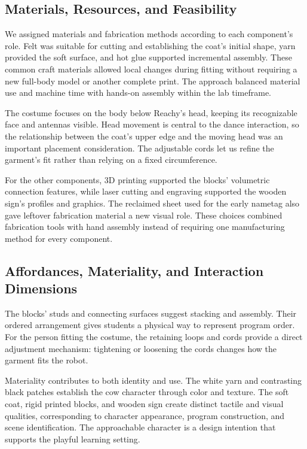 \documentclass[conference]{IEEEtran}
\begin{document}
\subsection{Materials, Resources, and Feasibility}

We assigned materials and fabrication methods according to each component's role. Felt was suitable for cutting and establishing the coat's initial shape, yarn provided the soft surface, and hot glue supported incremental assembly. These common craft materials allowed local changes during fitting without requiring a new full-body model or another complete print. The approach balanced material use and machine time with hands-on assembly within the lab timeframe.

The costume focuses on the body below Reachy's head, keeping its recognizable face and antennas visible. Head movement is central to the dance interaction, so the relationship between the coat's upper edge and the moving head was an important placement consideration. The adjustable cords let us refine the garment's fit rather than relying on a fixed circumference.

For the other components, 3D printing supported the blocks' volumetric connection features, while laser cutting and engraving supported the wooden sign's profiles and graphics. The reclaimed sheet used for the early nametag also gave leftover fabrication material a new visual role. These choices combined fabrication tools with hand assembly instead of requiring one manufacturing method for every component.

\subsection{Affordances, Materiality, and Interaction Dimensions}

The blocks' studs and connecting surfaces suggest stacking and assembly. Their ordered arrangement gives students a physical way to represent program order. For the person fitting the costume, the retaining loops and cords provide a direct adjustment mechanism: tightening or loosening the cords changes how the garment fits the robot.

Materiality contributes to both identity and use. The white yarn and contrasting black patches establish the cow character through color and texture. The soft coat, rigid printed blocks, and wooden sign create distinct tactile and visual qualities, corresponding to character appearance, program construction, and scene identification. The approachable character is a design intention that supports the playful learning setting.
\end{document}
